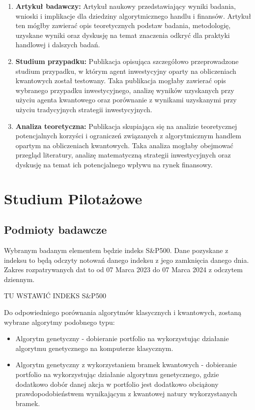 \documentclass[polish,envcountsect,10pt]{article}
\begin{document}
\begin{enumerate}
    \item \textbf{Artykuł badawczy:} Artykuł naukowy przedstawiający wyniki badania, wnioski i implikacje dla dziedziny algorytmicznego handlu i finansów. Artykuł ten mógłby zawierać opis teoretycznych podstaw badania, metodologię, uzyskane wyniki oraz dyskusję na temat znaczenia odkryć dla praktyki handlowej i dalszych badań.
    
    \item \textbf{Studium przypadku:} Publikacja opisująca szczegółowo przeprowadzone studium przypadku, w którym agent inwestycyjny oparty na obliczeniach kwantowych został testowany. Taka publikacja mogłaby zawierać opis wybranego przypadku inwestycyjnego, analizę wyników uzyskanych przy użyciu agenta kwantowego oraz porównanie z wynikami uzyskanymi przy użyciu tradycyjnych strategii inwestycyjnych.
    
    \item \textbf{Analiza teoretyczna:} Publikacja skupiająca się na analizie teoretycznej potencjalnych korzyści i ograniczeń związanych z algorytmicznym handlem opartym na obliczeniach kwantowych. Taka analiza mogłaby obejmować przegląd literatury, analizę matematyczną strategii inwestycyjnych oraz dyskusję na temat ich potencjalnego wpływu na rynek finansowy.
    
\end{enumerate}
\section{Studium Pilotażowe}

\subsection{Podmioty badawcze}

Wybranym badanym elementem będzie indeks S\&P500. Dane pozyskane z indeksu to będą odczyty notowań danego indeksu z jego zamknięcia danego dnia. Zakres rozpatrywanych dat to od 07 Marca 2023 do 07 Marca 2024 z odczytem dziennym. 

TU WSTAWIĆ INDEKS S\&P500

Do odpowiedniego porównania algorytmów klasycznych i kwantowych, zostaną wybrane algorytmy podobnego typu:
\begin{itemize}
    \item Algorytm genetyczny - dobieranie portfolio na wykorzystując działanie algorytmu genetycznego na komputerze klasycznym.
    \item Algorytm genetyczny z wykorzystaniem bramek kwantowych - dobieranie portfolio na wykorzystując działanie algorytmu genetycznego, gdzie dodatkowo dobór danej akcja w portfolio jest dodatkowo obciążony prawdopodobieństwem wynikającym z kwantowej natury wykorzystanych bramek.
\end{itemize}
\end{document}
